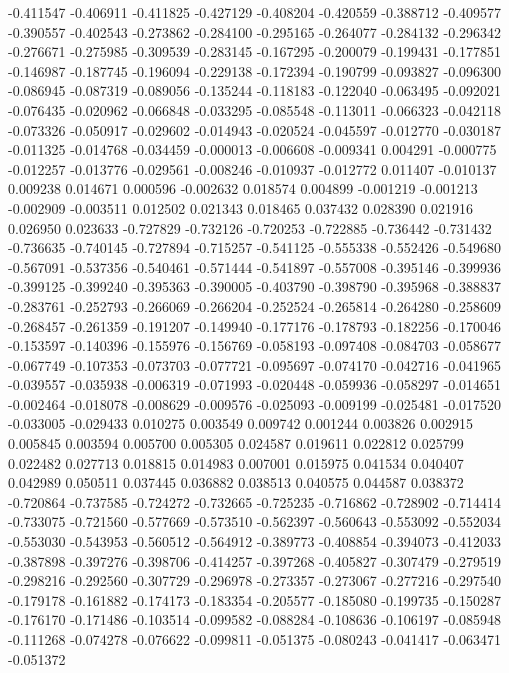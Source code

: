 -0.411547
-0.406911
-0.411825
-0.427129
-0.408204
-0.420559
-0.388712
-0.409577
-0.390557
-0.402543
-0.273862
-0.284100
-0.295165
-0.264077
-0.284132
-0.296342
-0.276671
-0.275985
-0.309539
-0.283145
-0.167295
-0.200079
-0.199431
-0.177851
-0.146987
-0.187745
-0.196094
-0.229138
-0.172394
-0.190799
-0.093827
-0.096300
-0.086945
-0.087319
-0.089056
-0.135244
-0.118183
-0.122040
-0.063495
-0.092021
-0.076435
-0.020962
-0.066848
-0.033295
-0.085548
-0.113011
-0.066323
-0.042118
-0.073326
-0.050917
-0.029602
-0.014943
-0.020524
-0.045597
-0.012770
-0.030187
-0.011325
-0.014768
-0.034459
-0.000013
-0.006608
-0.009341
0.004291
-0.000775
-0.012257
-0.013776
-0.029561
-0.008246
-0.010937
-0.012772
0.011407
-0.010137
0.009238
0.014671
0.000596
-0.002632
0.018574
0.004899
-0.001219
-0.001213
-0.002909
-0.003511
0.012502
0.021343
0.018465
0.037432
0.028390
0.021916
0.026950
0.023633
-0.727829
-0.732126
-0.720253
-0.722885
-0.736442
-0.731432
-0.736635
-0.740145
-0.727894
-0.715257
-0.541125
-0.555338
-0.552426
-0.549680
-0.567091
-0.537356
-0.540461
-0.571444
-0.541897
-0.557008
-0.395146
-0.399936
-0.399125
-0.399240
-0.395363
-0.390005
-0.403790
-0.398790
-0.395968
-0.388837
-0.283761
-0.252793
-0.266069
-0.266204
-0.252524
-0.265814
-0.264280
-0.258609
-0.268457
-0.261359
-0.191207
-0.149940
-0.177176
-0.178793
-0.182256
-0.170046
-0.153597
-0.140396
-0.155976
-0.156769
-0.058193
-0.097408
-0.084703
-0.058677
-0.067749
-0.107353
-0.073703
-0.077721
-0.095697
-0.074170
-0.042716
-0.041965
-0.039557
-0.035938
-0.006319
-0.071993
-0.020448
-0.059936
-0.058297
-0.014651
-0.002464
-0.018078
-0.008629
-0.009576
-0.025093
-0.009199
-0.025481
-0.017520
-0.033005
-0.029433
0.010275
0.003549
0.009742
0.001244
0.003826
0.002915
0.005845
0.003594
0.005700
0.005305
0.024587
0.019611
0.022812
0.025799
0.022482
0.027713
0.018815
0.014983
0.007001
0.015975
0.041534
0.040407
0.042989
0.050511
0.037445
0.036882
0.038513
0.040575
0.044587
0.038372
-0.720864
-0.737585
-0.724272
-0.732665
-0.725235
-0.716862
-0.728902
-0.714414
-0.733075
-0.721560
-0.577669
-0.573510
-0.562397
-0.560643
-0.553092
-0.552034
-0.553030
-0.543953
-0.560512
-0.564912
-0.389773
-0.408854
-0.394073
-0.412033
-0.387898
-0.397276
-0.398706
-0.414257
-0.397268
-0.405827
-0.307479
-0.279519
-0.298216
-0.292560
-0.307729
-0.296978
-0.273357
-0.273067
-0.277216
-0.297540
-0.179178
-0.161882
-0.174173
-0.183354
-0.205577
-0.185080
-0.199735
-0.150287
-0.176170
-0.171486
-0.103514
-0.099582
-0.088284
-0.108636
-0.106197
-0.085948
-0.111268
-0.074278
-0.076622
-0.099811
-0.051375
-0.080243
-0.041417
-0.063471
-0.051372
